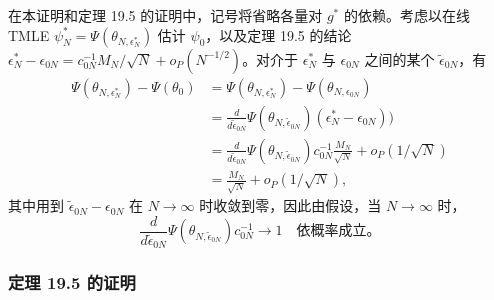 在本证明和定理 19.5 的证明中，记号将省略各量对 $g^*$ 的依赖。考虑以在线 TMLE $\psi_N^*=\Psi(\theta_{N,\epsilon_N^*})$ 估计 $\psi_0$，以及定理 19.5 的结论 $\epsilon_N^*-\epsilon_{0N}=c_{0N}^{-1}M_N/\sqrt N+o_P(N^{-1/2})$。对介于 $\epsilon_N^*$ 与 $\epsilon_{0N}$ 之间的某个 $\tilde\epsilon_{0N}$，有
\[
\begin{aligned}
 \Psi(\theta_{N,\epsilon_N^*})-\Psi(\theta_0)
 &=\Psi(\theta_{N,\epsilon_N^*})-\Psi(\theta_{N,\epsilon_{0N}})\\
 &=\frac d{d\tilde\epsilon_{0N}}\Psi(\theta_{N,\tilde\epsilon_{0N}})
 (\epsilon_N^*-\epsilon_{0N}))\\
 &=\frac d{d\tilde\epsilon_{0N}}\Psi(\theta_{N,\tilde\epsilon_{0N}})
 c_{0N}^{-1}\frac{M_N}{\sqrt N}+o_P(1/\sqrt N)\\
 &=\frac{M_N}{\sqrt N}+o_P(1/\sqrt N),
\end{aligned}
\]
其中用到 $\tilde\epsilon_{0N}-\epsilon_{0N}$ 在 $N\to\infty$ 时收敛到零，因此由假设，当 $N\to\infty$ 时，
\[
 \frac d{d\tilde\epsilon_{0N}}\Psi(\theta_{N,\tilde\epsilon_{0N}})c_{0N}^{-1}
 \to1\quad\text{依概率成立。}
\]

\subsubsection*{定理 19.5 的证明}

